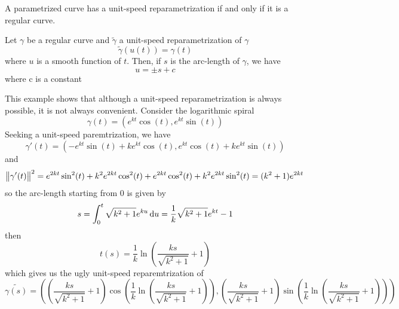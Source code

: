 \begin{proposition}
		A parametrized curve has a unit-speed reparametrization if and only if it is a regular curve.
    \end{proposition}

    \begin{corollary}
      Let \(\gamma\) be a regular curve and \(\tilde{\gamma}\) a unit-speed reparametrization
      of \(\gamma\)
      \[
\tilde{\gamma}(u(t)) = \gamma(t)
\]
      where \(u\) is a smooth function of \(t\). Then, if \(s\) is the arc-length of
      \(\gamma\), we have
      \[
u = \pm s + c
\]
      where c is a constant
    \end{corollary}

    \begin{example}
      This example shows that although a unit-speed reparametrization is always
      possible, it is not always convenient. Consider the logarithmic spiral
      \[
\gamma(t) = (e^{kt}\cos(t), e^{kt}\sin(t))
\]
      Seeking a unit-speed paremtrization, we have
      \[
\gamma'(t) = (-e^{kt}\sin(t) + ke^{kt}\cos(t), e^{kt}\cos(t) + ke^{kt}\sin(t))
\]
      and
      \[
\norm{\gamma'(t)}^{2} = e^{2kt}\sin^{2}(t) + k^{2}e^{2kt}\cos^{2}(t) +
        e^{2kt}\cos^{2}(t) + k^{2}e^{2kt}\sin^{2}(t) = (k^{2} + 1)e^{2kt}
\]
      so the arc-length starting from 0 is given by
      \[
s = \int^{t}_{0} \sqrt{k^{2}+1}e^{ku}\dif u = \frac{1}{k}\sqrt{k^{2} + 1}e^{kt}-1
\]
      then
      \[
t(s) = \frac{1}{k}\ln(\frac{ks}{\sqrt{k^{2}+1}}+1)
\]
      which gives us the ugly unit-speed reparemtrization of
      \[
\tilde{\gamma(s)} =
        ((\frac{ks}{\sqrt{k^{2}+1}}+1)\cos(\frac{1}{k}\ln(\frac{ks}{\sqrt{k^{2}+1}}+1)),
        (\frac{ks}{\sqrt{k^{2}+1}}+1)\sin(\frac{1}{k}\ln(\frac{ks}{\sqrt{k^{2}+1}}+1)))
\]
    \end{example}


